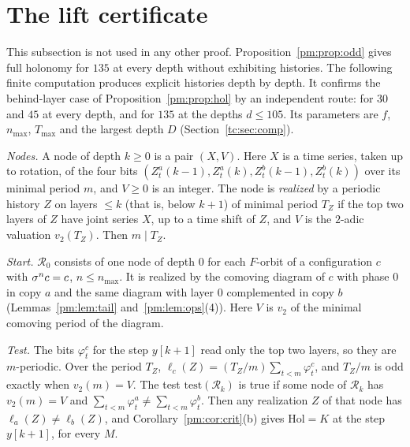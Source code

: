 \section{The lift certificate}\label{pm:sec:cert}

This subsection is not used in any other proof. Proposition~\ref{pm:prop:odd} gives full holonomy for $135$ at every depth without exhibiting histories. The following finite computation produces explicit histories depth by depth. It confirms the behind-layer case of Proposition~\ref{pm:prop:hol} by an independent route: for $30$ and $45$ at every depth, and for $135$ at the depths $d\le105$. Its parameters are $f$, $n_{\max}$, $T_{\max}$ and the largest depth $D$ (Section~\ref{tc:sec:comp}).

\emph{Nodes.} A node of depth $k\ge0$ is a pair $(X,V)$. Here $X$ is a time series, taken up to rotation, of the four bits $(Z^a_t(k-1),Z^a_t(k),Z^b_t(k-1),Z^b_t(k))$ over its minimal period $m$, and $V\ge0$ is an integer. The node is \emph{realized} by a periodic history $Z$ on layers $\le k$ (that is, below $k+1$) of minimal period $T_Z$ if the top two layers of $Z$ have joint series $X$, up to a time shift of $Z$, and $V$ is the $2$-adic valuation $v_2(T_Z)$. Then $m\mid T_Z$.

\emph{Start.} $\mathcal R_0$ consists of one node of depth $0$ for each $F$-orbit of a configuration $c$ with $\sigma^nc=c$, $n\le n_{\max}$. It is realized by the comoving diagram of $c$ with phase $0$ in copy $a$ and the same diagram with layer $0$ complemented in copy $b$ (Lemmas~\ref{pm:lem:tail} and~\ref{pm:lem:ops}(4)). Here $V$ is $v_2$ of the minimal comoving period of the diagram.

\emph{Test.} The bits $\varphi^c_t$ for the step $y[k+1]$ read only the top two layers, so they are $m$-periodic. Over the period $T_Z$, $\ell_c(Z)=(T_Z/m)\sum_{t<m}\varphi^c_t$, and $T_Z/m$ is odd exactly when $v_2(m)=V$. The test $\mathrm{test}(\mathcal R_k)$ is true if some node of $\mathcal R_k$ has $v_2(m)=V$ and $\sum_{t<m}\varphi^a_t\ne\sum_{t<m}\varphi^b_t$. Then any realization $Z$ of that node has $\ell_a(Z)\ne\ell_b(Z)$, and Corollary~\ref{pm:cor:crit}(b) gives $\mathrm{Hol}=K$ at the step $y[k+1]$, for every $M$.

